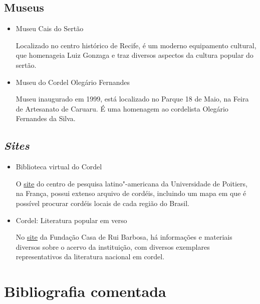 \documentclass[12pt]{extarticle}
\begin{document}
\subsection{Museus}

\begin{itemize}

\item Museu Cais do Sertão

Localizado no centro histórico de Recife, é um moderno equipamento cultural,
que homenageia Luiz Gonzaga e traz diversos aspectos da cultura popular do
sertão.

\item Museu do Cordel Olegário Fernandes

Museu inaugurado em 1999, está localizado no Parque 18 de Maio, na Feira de
Artesanato de Caruaru. É uma homenagem ao cordelista Olegário Fernandes da
Silva.

\end{itemize}

\subsection{\emph{Sites}}

\begin{itemize}

\item Biblioteca virtual do Cordel

O \href{http://cordel.edel.univ-poitiers.fr}{site} do centro de pesquisa
latino"-americana da Universidade de Poitiers, na França, possui extenso arquivo
de cordéis, incluindo um mapa em que é possível procurar cordéis locais de cada
região do Brasil.

\item Cordel: Literatura popular em verso

No \href{http://www.casaruibarbosa.gov.br/cordel/acervo.html}{site} da Fundação
Casa de Rui Barbosa, há informações e materiais diversos sobre o acervo da
instituição, com diversos exemplares representativos da literatura nacional em
cordel.
\end{itemize}

\section{Bibliografia comentada}
\end{document}
